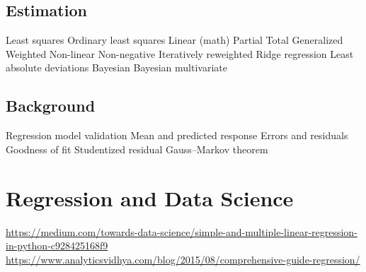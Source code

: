 \documentclass[11pt,a4paper]{article}
\begin{document}
\subsection{Estimation}
Least squares Ordinary least squares Linear (math) Partial Total Generalized Weighted Non-linear Non-negative Iteratively reweighted Ridge regression
Least absolute deviations Bayesian Bayesian multivariate

\subsection{Background}
Regression model validation Mean and predicted response Errors and residuals Goodness of fit Studentized residual Gauss–Markov theorem


\section{Regression and Data Science}
{\href {https://medium.com/towards-data-science/simple-and-multiple-linear-regression-in-python-c928425168f9} 
{https://medium.com/towards-data-science/simple-and-multiple-linear-regression-in-python-c928425168f9}
} \\
\href{https://www.analyticsvidhya.com/blog/2015/08/comprehensive-guide-regression/}{https://www.analyticsvidhya.com/blog/2015/08/comprehensive-guide-regression/}
\end{document}
